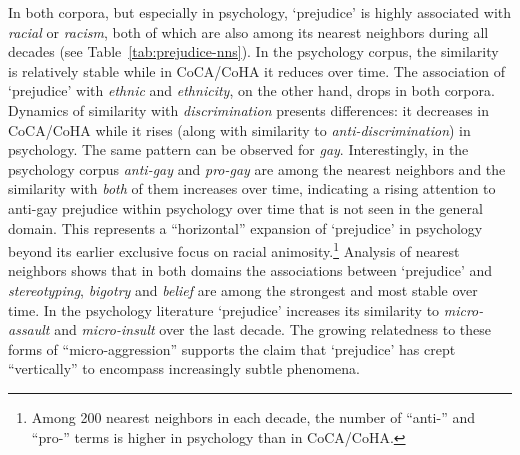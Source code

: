 \documentclass[output=paper]{langsci/langscibook}
\begin{document}
In both corpora, but especially in psychology, `prejudice' is highly associated with \textit{racial} or \textit{racism}, both of which are also among its nearest neighbors during all decades (see Table~\ref{tab:prejudice-nns}). In the psychology corpus, the similarity is relatively stable while in CoCA/CoHA it reduces over time. The association of `prejudice' with \textit{ethnic} and \textit{ethnicity}, on the other hand, drops in both corpora. 
Dynamics of similarity with \textit{discrimination} presents differences: it decreases in CoCA/CoHA while it rises (along with similarity to \textit{anti-discrimination}) in psychology. The same pattern can be observed for \textit{gay}.
Interestingly, in the psychology corpus \textit{anti-gay} and \textit{pro-gay} are among the nearest neighbors and the similarity with \emph{both} of them increases over time, indicating a rising attention to anti-gay prejudice within psychology over time that is not seen in the general domain. This represents a ``horizontal'' expansion of `prejudice' in psychology beyond its earlier exclusive focus on racial animosity.\footnote{Among 200 nearest neighbors in each decade, the number of ``anti-'' and ``pro-'' terms is higher in psychology than in CoCA/CoHA.}  
Analysis of nearest neighbors shows that in both domains the associations between `prejudice' and \textit{stereotyping}, \textit{bigotry} and \textit{belief} are among the strongest and most stable over time.
In the psychology literature `prejudice' increases its similarity to \textit{micro-assault} and \textit{micro-insult} over the last decade. The growing relatedness to these forms of ``micro-aggression'' \citep{lilienfeld2017microaggressions} supports the claim that `prejudice' has crept ``vertically'' to encompass increasingly subtle phenomena. 
\end{document}
